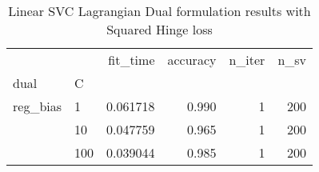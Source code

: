 \begin{table}[H]
\centering
\caption{Linear SVC Lagrangian Dual formulation results with Squared Hinge loss}
\label{linear_lagrangian_dual_l2_svc_cv_results}
\begin{tabular}{llrrrr}
\toprule
         &     &  fit\_time &  accuracy &  n\_iter &  n\_sv \\
dual & C &           &           &         &       \\
\midrule
reg\_bias & 1   &  0.061718 &     0.990 &       1 &   200 \\
         & 10  &  0.047759 &     0.965 &       1 &   200 \\
         & 100 &  0.039044 &     0.985 &       1 &   200 \\
\bottomrule
\end{tabular}
\end{table}
